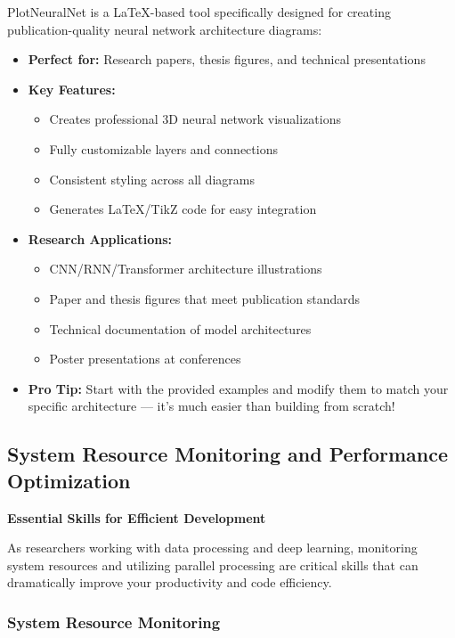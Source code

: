 \documentclass[11pt,a4paper]{article}
\begin{document}
PlotNeuralNet is a LaTeX-based tool specifically designed for creating publication-quality neural network architecture diagrams:
\begin{itemize}
    \item \textbf{Perfect for:} Research papers, thesis figures, and technical presentations
    \item \textbf{Key Features:}
    \begin{itemize}
        \item Creates professional 3D neural network visualizations
        \item Fully customizable layers and connections
        \item Consistent styling across all diagrams
        \item Generates LaTeX/TikZ code for easy integration
    \end{itemize}
    \item \textbf{Research Applications:}
    \begin{itemize}
        \item CNN/RNN/Transformer architecture illustrations
        \item Paper and thesis figures that meet publication standards
        \item Technical documentation of model architectures
        \item Poster presentations at conferences
    \end{itemize}
    \item \textbf{Pro Tip:} Start with the provided examples and modify them to match your specific architecture — it's much easier than building from scratch!
\end{itemize}

\subsection{System Resource Monitoring and Performance Optimization}

\textbf{Essential Skills for Efficient Development}

As researchers working with data processing and deep learning, monitoring system resources and utilizing parallel processing are critical skills that can dramatically improve your productivity and code efficiency.

\subsubsection{System Resource Monitoring}
\end{document}
